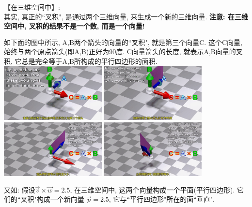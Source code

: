 \documentclass[UTF8]{ctexart}
\begin{document}
	
	
	
	【在三维空间中】:\\	
	其实, 真正的``叉积", 是通过两个三维向量, 来生成一个新的三维向量. \textbf{注意: 在三维空间中, 叉积的结果不是一个数, 而是一个向量!} \\
	
\begin{myEnvSample}
	如下面的图中所示, A,B两个箭头的向量的``叉积", 就是第三个向量C. 这个C向量, 始终与两个原点箭头(即A,B)正好为90度.  C向量箭头的长度, 就表示A,B向量的叉积, 它总是完全等于A,B所构成的平行四边形的面积.\\
	
		\includegraphics[width=0.4\textwidth]{img/0076.png}
		\includegraphics[width=0.4\textwidth]{img/0077.png}\\
		\includegraphics[width=0.4\textwidth]{img/0078.png}
		\includegraphics[width=0.4\textwidth]{img/0079.png}\\
	\end{myEnvSample}


	\begin{myEnvSample}
	又如: 假设$\vec{v} \times \vec{w} = 2.5$, 在三维空间中, 这两个向量构成一个平面(平行四边形). 它们的``叉积"构成一个新向量 $\vec{p}=2.5$, 它与``平行四边形"所在的面``垂直".\\
	
	
	
	
	
	\end{myEnvSample}
\end{document}

